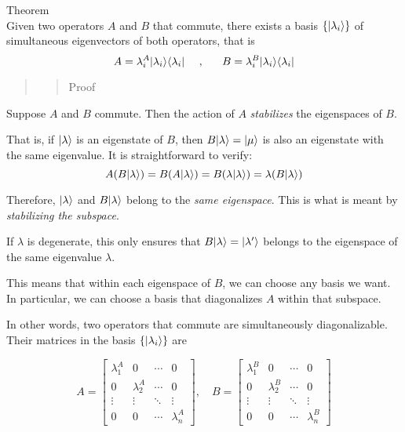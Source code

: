 \documentclass[11pt]{article}
\begin{document}
Theorem \\
Given two operators \(A\) and \(B\) that commute, there exists a basis
\(\{|\lambda_i\rangle\}\) of simultaneous eigenvectors of both operators,
that is \[
A = \lambda_i^A | \lambda_i\rangle \langle \lambda_i| ~~~~,~~~~~ B = \lambda_i^B | \lambda_i\rangle \langle \lambda_i|
\]

\begin{quote}
\begin{quote}
Proof
\end{quote}
\end{quote}

Suppose \(A\) and \(B\) commute. Then the action of \(A\)
\emph{stabilizes} the eigenspaces of \(B\).

That is, if \(|\lambda\rangle\) is an eigenstate of \(B\), then
\(B|\lambda\rangle = |\mu\rangle\) is also an eigenstate with the same
eigenvalue. It is straightforward to verify: \[
A(B|\lambda\rangle) = B(A|\lambda\rangle) = B(\lambda |\lambda\rangle) = \lambda (B |\lambda\rangle)
\]

Therefore, \(|\lambda\rangle\) and \(B|\lambda\rangle\) belong to the
\emph{same eigenspace}. This is what is meant by \emph{stabilizing the
subspace}.

If \(\lambda\) is degenerate, this only ensures that
\(B|\lambda\rangle = |\lambda'\rangle\) belongs to the eigenspace of the
same eigenvalue \(\lambda\).

This means that within each eigenspace of \(B\), we can choose any basis
we want. In particular, we can choose a basis that diagonalizes \(A\)
within that subspace.

    In other words, two operators that commute are simultaneously
diagonalizable. Their matrices in the basis \(\{|\lambda_i\rangle\}\) are

\[
A = \begin{bmatrix} \lambda_1^A & 0 & \cdots & 0 \\ 0 & \lambda_2^A & \cdots & 0 \\ \vdots & \vdots & \ddots & \vdots \\ 0 & 0 & \cdots & \lambda_n^A \end{bmatrix}, \quad
B = \begin{bmatrix} \lambda_1^B & 0 & \cdots & 0 \\ 0 & \lambda_2^B & \cdots & 0 \\ \vdots & \vdots & \ddots & \vdots \\ 0 & 0 & \cdots & \lambda_n^B \end{bmatrix}
\]
\end{document}
